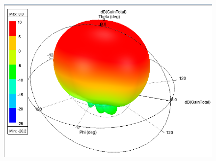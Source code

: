 \documentclass[10pt, a4paper]{article}%
\begin{document}
\begin{figure}[ht!]
\begin{minipage}{0.32\textwidth}
		\centering
		\includegraphics[width= 1\textwidth]{RAD_dB_coax.png}
	\end{minipage}


	\end{figure}
\end{document}
